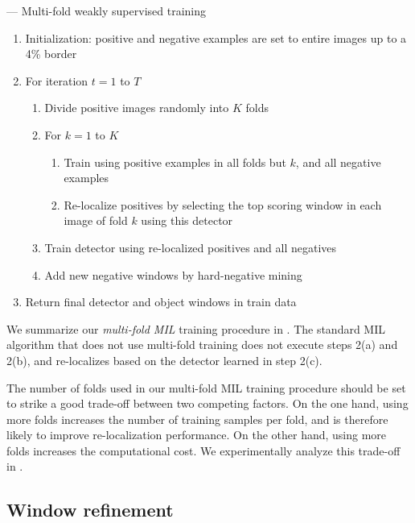 \documentclass[10pt,journal,cspaper,final,twocolumn,compsoc]{./IEEEtran}
\begin{document}
\begin{algorithm}[t]
\caption{--- Multi-fold weakly supervised training}{
\begin{enumerate}
\item Initialization: positive and negative examples are set to entire images up to a 4\%  border
\item For iteration $t=1$ to $T$
    \begin{enumerate}[itemsep=0mm,topsep=-.5mm]
    \item Divide positive images randomly into $K$ folds
    \item For $k=1$ to $K$ 
        \begin{enumerate}[itemsep=0mm,topsep=-.5mm]
        \item Train using positive examples in all folds but $k$, and all negative examples
	\item Re-localize positives by selecting the top scoring window in each image of fold $k$ using this detector
        \end{enumerate}
    \item Train detector using re-localized positives and all negatives
    \item Add new negative windows by hard-negative mining 
    \end{enumerate}
\item Return final detector and object windows in train data
\end{enumerate}}
\label{algo:kfold}
\end{algorithm}

We summarize our {\em multi-fold MIL} training procedure
in .  The standard MIL algorithm that does not
use multi-fold training does not execute steps 2(a) and
2(b), and re-localizes based on the detector learned in
step 2(c).


The number of folds used in our multi-fold MIL training
procedure should be set to strike a good trade-off between
two competing factors. On the one hand, using more folds
increases the number of training samples  per fold, and is
therefore likely to improve re-localization performance.
On the other hand, using more folds 
increases the computational cost. We
experimentally analyze this trade-off in .

\subsection{Window refinement}\label{sec:refinement}
\end{document}

